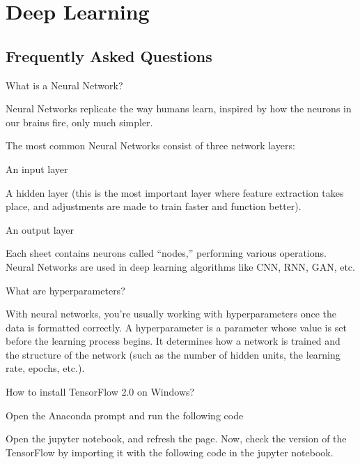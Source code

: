 	\chapter{Deep Learning}
	\section{Frequently Asked Questions}
	\resetquestioncounter{}
	\begin{qanda}
		\begin{question}
What is a Neural Network?
		\end{question}
		\begin{answer}
Neural Networks replicate the way humans learn, inspired by how the neurons in our brains fire, only much simpler.

The most common Neural Networks consist of three network layers:
	\begin{bulletedlist}
		\item An input layer
		\item A hidden layer (this is the most important layer where feature extraction takes place, and adjustments are made to train faster and function better).
		\item An output layer
	\end{bulletedlist}
 Each sheet contains neurons called ``nodes,'' performing various operations. Neural Networks are used in deep learning algorithms like CNN, RNN, GAN, etc.
		\end{answer}
	\end{qanda}


	\begin{qanda}
		\begin{question}
			What are hyperparameters?
		\end{question}
		\begin{answer}
With neural networks, you're usually working with hyperparameters once the data is formatted correctly. A hyperparameter is a parameter whose value is set before the learning process begins. It determines how a network is trained and the structure of the network (such as the number of hidden units, the learning rate, epochs, etc.).
		\end{answer}
	\end{qanda}


	\begin{qanda}
		\begin{question}
How to install TensorFlow 2.0 on Windows?
		\end{question}
		\begin{answer}
Open the Anaconda prompt and run the following code

Open the jupyter notebook, and refresh the page. Now, check the version of the TensorFlow by importing it with the following code in the jupyter notebook.

		\end{answer}
	\end{qanda}


